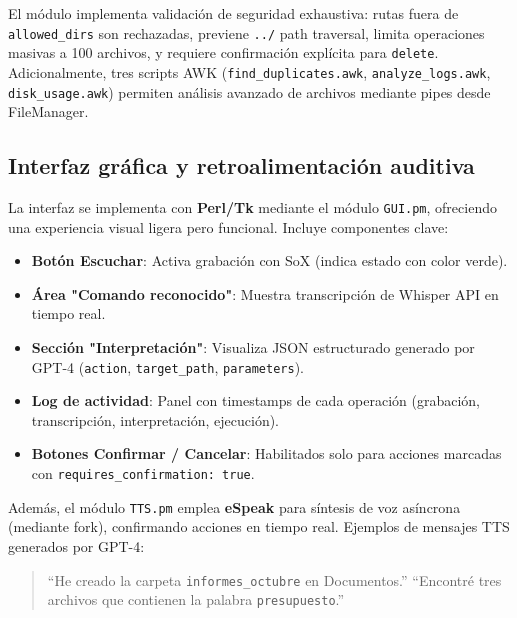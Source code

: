 \documentclass[12pt,a4paper]{report}
\numberwithin{figure}{section}
\begin{document}
El módulo implementa validación de seguridad exhaustiva: rutas fuera de \texttt{allowed\_dirs} son rechazadas, previene \texttt{../} path traversal, limita operaciones masivas a 100 archivos, y requiere confirmación explícita para \texttt{delete}.  
Adicionalmente, tres scripts AWK (\texttt{find\_duplicates.awk}, \texttt{analyze\_logs.awk}, \texttt{disk\_usage.awk}) permiten análisis avanzado de archivos mediante pipes desde FileManager.

\vspace{1em}
\subsection[Interfaz gráfica y retroalimentación]{Interfaz gráfica y retroalimentación auditiva}
\label{subsec:interfaz_tk}

La interfaz se implementa con \textbf{Perl/Tk} mediante el módulo \texttt{GUI.pm}, ofreciendo una experiencia visual ligera pero funcional.  
Incluye componentes clave:
\begin{itemize}
    \item \textbf{Botón Escuchar}: Activa grabación con SoX (indica estado con color verde).
    \item \textbf{Área "Comando reconocido"}: Muestra transcripción de Whisper API en tiempo real.
    \item \textbf{Sección "Interpretación"}: Visualiza JSON estructurado generado por GPT-4 (\texttt{action}, \texttt{target\_path}, \texttt{parameters}).
    \item \textbf{Log de actividad}: Panel con timestamps de cada operación (grabación, transcripción, interpretación, ejecución).
    \item \textbf{Botones Confirmar / Cancelar}: Habilitados solo para acciones marcadas con \texttt{requires\_confirmation: true}.
\end{itemize}

Además, el módulo \texttt{TTS.pm} emplea \textbf{eSpeak} para síntesis de voz asíncrona (mediante fork), confirmando acciones en tiempo real.  
Ejemplos de mensajes TTS generados por GPT-4:
\begin{quote}
    “He creado la carpeta \texttt{informes\_octubre} en Documentos.”  
    “Encontré tres archivos que contienen la palabra \texttt{presupuesto}.”  
\end{quote}

\vspace{0.5em}
\end{document}

